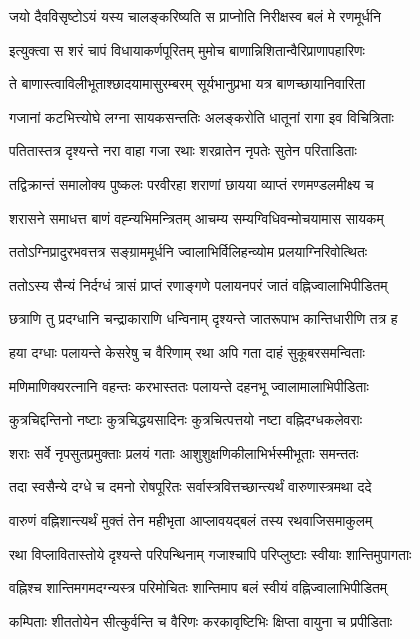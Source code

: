 \twolineshloka
{जयो दैवविसृष्टोऽयं यस्य चालङ्करिष्यति}
{स प्राप्नोति निरीक्षस्व बलं मे रणमूर्धनि}%

\twolineshloka
{इत्युक्त्वा स शरं चापं विधायाकर्णपूरितम्}
{मुमोच बाणान्निशितान्वैरिप्राणापहारिणः}%

\twolineshloka
{ते बाणास्त्वाविलीभूताश्छादयामासुरम्बरम्}
{सूर्यभानुप्रभा यत्र बाणच्छायानिवारिता}%

\twolineshloka
{गजानां कटभित्त्योघे लग्ना सायकसन्ततिः}
{अलङ्करोति धातूनां रागा इव विचित्रिताः}%

\twolineshloka
{पतितास्तत्र दृश्यन्ते नरा वाहा गजा रथाः}
{शरव्रातेन नृपतेः सुतेन परिताडिताः}%

\twolineshloka
{तद्विक्रान्तं समालोक्य पुष्कलः परवीरहा}
{शराणां छायया व्याप्तं रणमण्डलमीक्ष्य च}%

\twolineshloka
{शरासने समाधत्त बाणं वह्न्यभिमन्त्रितम्}
{आचम्य सम्यग्विधिवन्मोचयामास सायकम्}%

\twolineshloka
{ततोऽग्निप्रादुरभवत्तत्र सङ्ग्राममूर्धनि}
{ज्वालाभिर्विलिहन्व्योम प्रलयाग्निरिवोत्थितः}%

\twolineshloka
{ततोऽस्य सैन्यं निर्दग्धं त्रासं प्राप्तं रणाङ्गणे}
{पलायनपरं जातं वह्निज्वालाभिपीडितम्}%

\twolineshloka
{छत्राणि तु प्रदग्धानि चन्द्राकाराणि धन्विनाम्}
{दृश्यन्ते जातरूपाभ कान्तिधारीणि तत्र ह}%

\twolineshloka
{हया दग्धाः पलायन्ते केसरेषु च वैरिणाम्}
{रथा अपि गता दाहं सुकूबरसमन्विताः}%

\twolineshloka
{मणिमाणिक्यरत्नानि वहन्तः करभास्ततः}
{पलायन्ते दहनभू ज्वालामालाभिपीडिताः}%

\twolineshloka
{कुत्रचिद्दन्तिनो नष्टाः कुत्रचिद्धयसादिनः}
{कुत्रचित्पत्तयो नष्टा वह्निदग्धकलेवराः}%

\twolineshloka
{शराः सर्वे नृपसुतप्रमुक्ताः प्रलयं गताः}
{आशुशुक्षणिकीलाभिर्भस्मीभूताः समन्ततः}%

\twolineshloka
{तदा स्वसैन्ये दग्धे च दमनो रोषपूरितः}
{सर्वास्त्रवित्तच्छान्त्यर्थं वारुणास्त्रमथा ददे}%

\twolineshloka
{वारुणं वह्निशान्त्यर्थं मुक्तं तेन महीभृता}
{आप्लावयद्बलं तस्य रथवाजिसमाकुलम्}%

\twolineshloka
{रथा विप्लावितास्तोये दृश्यन्ते परिपन्थिनाम्}
{गजाश्चापि परिप्लुष्टाः स्वीयाः शान्तिमुपागताः}%

\twolineshloka
{वह्निश्च शान्तिमगमदग्न्यस्त्र परिमोचितः}
{शान्तिमाप बलं स्वीयं वह्निज्वालाभिपीडितम्}%

\twolineshloka
{कम्पिताः शीततोयेन सीत्कुर्वन्ति च वैरिणः}
{करकावृष्टिभिः क्षिप्ता वायुना च प्रपीडिताः}%

